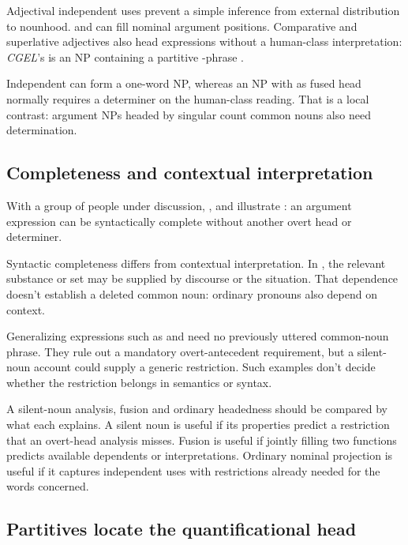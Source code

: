 \documentclass[12pt]{article}
\begin{document}
Adjectival independent uses prevent a simple inference from external distribution to nounhood.  and  can fill nominal argument positions. Comparative and superlative adjectives also head expressions without a human-class interpretation: \textit{CGEL}'s  is an NP containing a partitive -phrase \citep[332--333, 416--423]{huddleston2002}.

Independent  can form a one-word NP, whereas an NP with  as fused head normally requires a determiner on the human-class reading. That is a local contrast: argument NPs headed by singular count common nouns also need determination.

\subsection{Completeness and contextual interpretation}

With a group of people under discussion, ,  and  illustrate : an argument expression can be syntactically complete without another overt head or determiner.

Syntactic completeness differs from contextual interpretation. In , the relevant substance or set may be supplied by discourse or the situation. That dependence doesn't establish a deleted common noun: ordinary pronouns also depend on context.

Generalizing expressions such as  and  need no previously uttered common-noun phrase. They rule out a mandatory overt-antecedent requirement, but a silent-noun account could supply a generic restriction. Such examples don't decide whether the restriction belongs in semantics or syntax.

A silent-noun analysis, fusion and ordinary headedness should be compared by what each explains. A silent noun is useful if its properties predict a restriction that an overt-head analysis misses. Fusion is useful if jointly filling two functions predicts available dependents or interpretations. Ordinary nominal projection is useful if it captures independent uses with restrictions already needed for the words concerned.

\subsection{Partitives locate the quantificational head}
\end{document}
